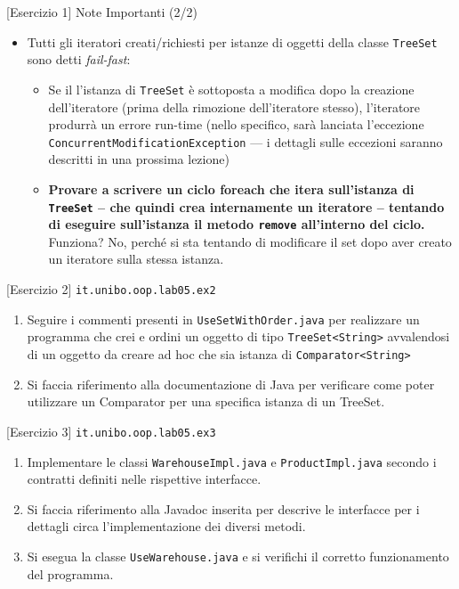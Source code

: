 \documentclass[presentation]{beamer}
\begin{document}
\begin{frame}{[Esercizio 1] Note Importanti (2/2)}
\begin{itemize}
\item Tutti gli iteratori creati/richiesti per istanze di oggetti della classe \texttt{TreeSet} sono detti \emph{fail-fast}:
\begin{itemize}
\item Se il l'istanza di \texttt{TreeSet} è sottoposta a modifica dopo la creazione dell'iteratore (prima della rimozione dell'iteratore stesso), l'iteratore produrrà un errore run-time (nello specifico, sarà lanciata l'eccezione \texttt{ConcurrentModificationException} --- i dettagli sulle eccezioni saranno descritti in una prossima lezione)
\item \textbf{Provare a scrivere un ciclo foreach che itera sull'istanza di \texttt{TreeSet} -- che quindi crea internamente un iteratore -- tentando di eseguire sull'istanza il metodo \texttt{remove} all'interno del ciclo.} Funziona? No, perché si sta tentando di modificare il set dopo aver creato un iteratore sulla stessa istanza.
\end{itemize}
\end{itemize}

\end{frame}

\begin{frame}{[Esercizio 2] \texttt{it.unibo.oop.lab05.ex2}}
\begin{enumerate}
\item Seguire i commenti presenti in \texttt{UseSetWithOrder.java} per realizzare un programma che crei e ordini un oggetto di tipo \texttt{TreeSet<String>} avvalendosi di un oggetto da creare ad hoc che sia istanza di \texttt{Comparator<String>}
\item Si faccia riferimento alla documentazione di Java per verificare come poter utilizzare un Comparator per una specifica istanza di un TreeSet.
\end{enumerate}
\end{frame}

\begin{frame}{[Esercizio 3] \texttt{it.unibo.oop.lab05.ex3}}
\begin{enumerate}
\item Implementare le classi \texttt{WarehouseImpl.java} e \texttt{ProductImpl.java} secondo i contratti definiti nelle rispettive interfacce.
\item Si faccia riferimento alla Javadoc inserita per descrive le interfacce per i dettagli circa l'implementazione dei diversi metodi.
\item Si esegua la classe \texttt{UseWarehouse.java} e si verifichi il corretto funzionamento del programma.
\end{enumerate}
\end{frame}
\end{document}
